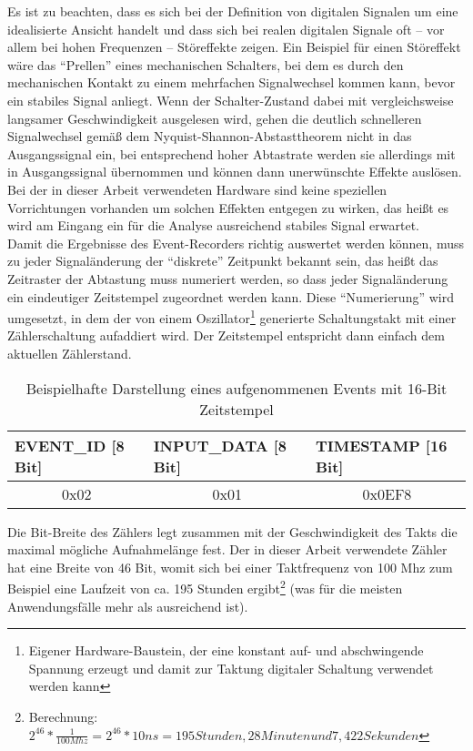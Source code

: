 Es ist zu beachten, dass es sich bei der Definition von digitalen Signalen um eine idealisierte Ansicht handelt und dass sich bei realen digitalen Signale oft -- vor allem bei hohen Frequenzen -- Störeffekte zeigen. Ein Beispiel für einen Störeffekt wäre das ``Prellen'' eines mechanischen Schalters, bei dem es durch den mechanischen Kontakt zu einem mehrfachen Signalwechsel kommen kann, bevor ein stabiles Signal anliegt. Wenn der Schalter-Zustand dabei mit vergleichsweise langsamer Geschwindigkeit ausgelesen wird, gehen die deutlich schnelleren Signalwechsel gemäß dem Nyquist-Shannon-Abstasttheorem nicht in das Ausgangssignal ein, bei entsprechend hoher Abtastrate werden sie allerdings mit in Ausgangssignal übernommen und können dann unerwünschte Effekte auslösen.\\
Bei der in dieser Arbeit verwendeten Hardware sind keine speziellen Vorrichtungen vorhanden um solchen Effekten entgegen zu wirken, das heißt es wird am Eingang ein für die Analyse ausreichend stabiles Signal erwartet.   \\

Damit die Ergebnisse des Event-Recorders richtig auswertet werden können, muss zu jeder Signaländerung der ``diskrete'' Zeitpunkt bekannt sein, das heißt das Zeitraster der Abtastung muss numeriert werden, so dass jeder Signaländerung ein eindeutiger Zeitstempel zugeordnet werden kann.
Diese ``Numerierung'' wird umgesetzt, in dem der von einem Oszillator\footnote{Eigener Hardware-Baustein, der eine konstant auf- und abschwingende Spannung erzeugt und damit zur Taktung digitaler Schaltung verwendet werden kann} generierte Schaltungstakt mit einer Zählerschaltung aufaddiert wird. Der Zeitstempel entspricht dann einfach dem aktuellen Zählerstand.\\


\begin{table}[h]
\centering
\begin{tabular}{|l|l|l|}
\hline
\rowcolor[HTML]{EFEFEF} 
	EVENT\_ID [8 Bit] & INPUT\_DATA [8 Bit] & TIMESTAMP [16 Bit]\\ \hline
	\multicolumn{1}{|c|}{0x02} & \multicolumn{1}{c|}{0x01} & \multicolumn{1}{c|}{0x0EF8} \\ \hline
\end{tabular}
\caption{Beispielhafte Darstellung eines aufgenommenen Events mit 16-Bit Zeitstempel}
\label{my-label}
\end{table}


Die Bit-Breite des Zählers legt zusammen mit der Geschwindigkeit des Takts die maximal mögliche Aufnahmelänge fest. Der in dieser Arbeit verwendete Zähler hat eine Breite von 46 Bit, womit sich bei einer Taktfrequenz von 100 Mhz zum Beispiel eine Laufzeit von ca. 195 Stunden ergibt\footnote{Berechnung: \(2^{46} * \frac{1}{100 Mhz} = 2^{46} * 10 ns = 195 Stunden, 28 Minuten und 7,422 Sekunden \)} (was für die meisten Anwendungsfälle mehr als ausreichend ist). 



